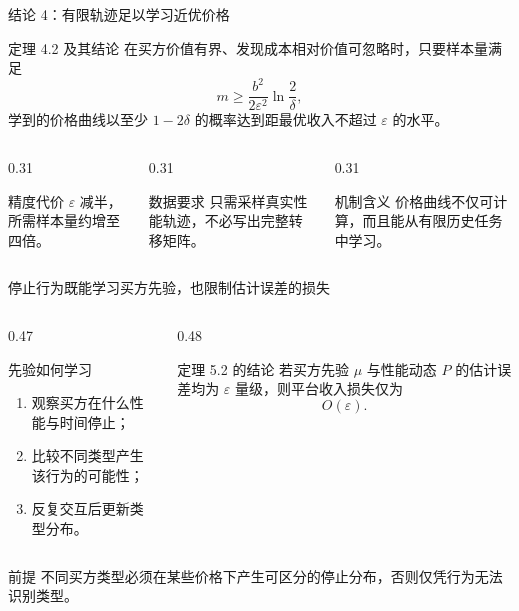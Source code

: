 \documentclass[10pt,aspectratio=169]{beamer}
\begin{document}
\begin{frame}{结论 4：有限轨迹足以学习近优价格}
  \begin{alertblock}{定理 4.2 及其结论}
    在买方价值有界、发现成本相对价值可忽略时，只要样本量满足
    \[
      m\ge \frac{b^2}{2\varepsilon^2}\ln\frac{2}{\delta},
    \]
    学到的价格曲线以至少 $1-2\delta$ 的概率达到距最优收入不超过 $\varepsilon$ 的水平。
  \end{alertblock}
  \begin{columns}[T,onlytextwidth]
    \begin{column}{0.31\textwidth}
      \begin{block}{精度代价}
        $\varepsilon$ 减半，所需样本量约增至四倍。
      \end{block}
    \end{column}
    \begin{column}{0.31\textwidth}
      \begin{block}{数据要求}
        只需采样真实性能轨迹，不必写出完整转移矩阵。
      \end{block}
    \end{column}
    \begin{column}{0.31\textwidth}
      \begin{block}{机制含义}
        价格曲线不仅可计算，而且能从有限历史任务中学习。
      \end{block}
    \end{column}
  \end{columns}
\end{frame}

\begin{frame}{停止行为既能学习买方先验，也限制估计误差的损失}
  \begin{columns}[T,onlytextwidth]
    \begin{column}{0.47\textwidth}
      \begin{block}{先验如何学习}
        \begin{enumerate}
          \item 观察买方在什么性能与时间停止；
          \item 比较不同类型产生该行为的可能性；
          \item 反复交互后更新类型分布。
        \end{enumerate}
      \end{block}
    \end{column}
    \begin{column}{0.48\textwidth}
      \begin{alertblock}{定理 5.2 的结论}
        若买方先验 $\mu$ 与性能动态 $P$ 的估计误差均为 $\varepsilon$ 量级，则平台收入损失仅为
        \[
          O(\varepsilon).
        \]
      \end{alertblock}
    \end{column}
  \end{columns}
  \vspace{0.6em}
  \begin{block}{前提}
    不同买方类型必须在某些价格下产生可区分的停止分布，否则仅凭行为无法识别类型。
  \end{block}
\end{frame}
\end{document}
